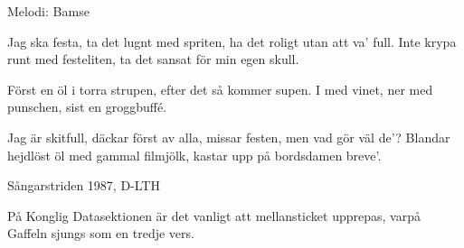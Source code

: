 \begin{song}

\begin{songmeta}
Melodi: Bamse
\end{songmeta}

\begin{songtext}
Jag ska festa, ta det lugnt med spriten,
ha det roligt utan att va' full.
Inte krypa runt med festeliten,
ta det sansat för min egen skull.

Först en öl i torra strupen,
efter det så kommer supen.
I med vinet, ner med punschen,
sist en groggbuffé.

Jag är skitfull, däckar först av alla,
missar festen, men vad gör väl de'?
Blandar hejdlöst öl med gammal filmjölk,
kastar upp på bordsdamen breve'.
\end{songtext}

\begin{songnotes}
Sångarstriden 1987, D-LTH

\noindent På Konglig Datasektionen är det vanligt att mellansticket upprepas, varpå Gaffeln sjungs som en tredje vers.
\end{songnotes}

\end{song}
